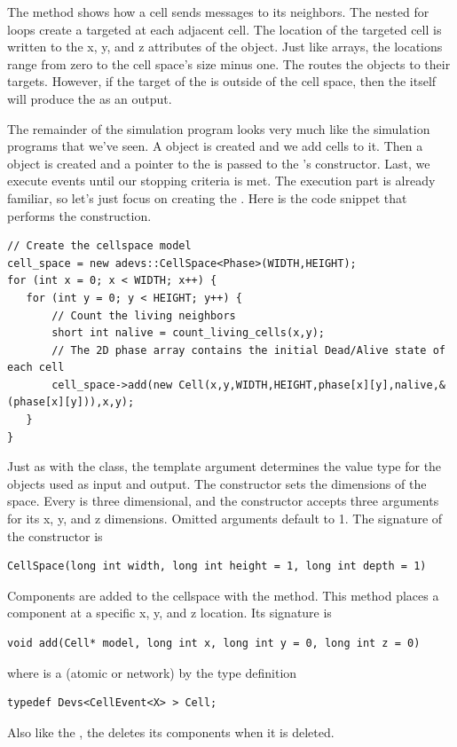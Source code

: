 The  method shows how a cell sends messages to its neighbors. The nested for loops create a  targeted at each adjacent cell. The location of the targeted cell is written to the x, y, and z attributes of the  object. Just like arrays, the locations range from zero to the cell space's size minus one. The  routes the  objects to their targets. However, if the target of the  is outside of the cell space, then the  itself will produce the  as an output.

The remainder of the simulation program looks very much like the simulation programs that we've seen. A  object is created and we add cells to it. Then a  object is created and a pointer to the  is passed to the 's constructor. Last, we execute events until our stopping criteria is met. The execution part is already familiar, so let's just focus on creating the . Here is the code snippet that performs the construction.
\begin{verbatim}
// Create the cellspace model
cell_space = new adevs::CellSpace<Phase>(WIDTH,HEIGHT);
for (int x = 0; x < WIDTH; x++) {
   for (int y = 0; y < HEIGHT; y++) {
       // Count the living neighbors
       short int nalive = count_living_cells(x,y);
       // The 2D phase array contains the initial Dead/Alive state of each cell
       cell_space->add(new Cell(x,y,WIDTH,HEIGHT,phase[x][y],nalive,&(phase[x][y])),x,y);
   }
}
\end{verbatim}

Just as with the  class, the  template argument determines the value type for the  objects used as input and output. The  constructor sets the dimensions of the space. Every  is three dimensional, and the constructor accepts three arguments for its x, y, and z dimensions. Omitted arguments default to 1. The signature of the constructor is
\begin{verbatim}
CellSpace(long int width, long int height = 1, long int depth = 1)
\end{verbatim}

Components are added to the cellspace with the  method. This method places a component at a specific x, y, and z location. Its signature is
\begin{verbatim}
void add(Cell* model, long int x, long int y = 0, long int z = 0)
\end{verbatim}
where  is a  (atomic or network) by the type definition
\begin{verbatim}
typedef Devs<CellEvent<X> > Cell;
\end{verbatim}
Also like the , the  deletes its components when it is deleted.

